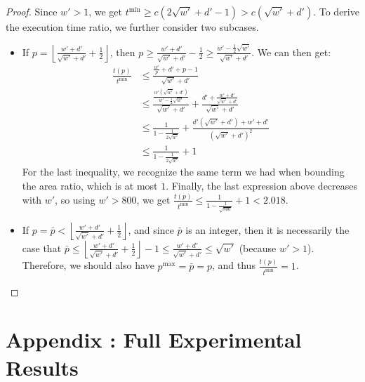 \documentclass{article}
\begin{document}
\begin{proof}
Since $w'>1$, we get $t^{\min}\ge c(2\sqrt{w'}+d'-1)>c(\sqrt{w'}+d')$. To derive the execution time ratio, we further consider two subcases.
\begin{itemize}
\item If $p=\left\lfloor \frac{w'+d'}{\sqrt{w'}+d'} +\frac{1}{2}\right\rfloor$, then $p\geq \frac{w'+d'}{\sqrt{w'}+d'} - \frac{1}{2} \geq \frac{w'-\frac{1}{2}\sqrt{w'}}{\sqrt{w'}+d'}$. We can then get:
\begin{align*}
\frac{t(p)}{t^{\min}} &\leq \frac{\frac{w'}{p}+d'+p-1}{\sqrt{w'}+d'} \\
&\leq \frac{\frac{w'(\sqrt{w'}+d')}{w'-\frac{1}{2}\sqrt{w'}}}{\sqrt{w'}+d'}+\frac{d'+\frac{w'+d'}{\sqrt{w'}+d'}}{\sqrt{w'}+d'} \\
&\leq \frac{1}{1-\frac{1}{2\sqrt{w'}}}+\frac{d'(\sqrt{w'}+d')+w'+d'}{(\sqrt{w'}+d')^2}\\
&\leq \frac{1}{1-\frac{1}{2\sqrt{w'}}}+1
\end{align*}
For the last inequality, we recognize the same term we had when bounding the area ratio, which is at most $1$. Finally, the last expression above decreases with $w'$, so using $w'>800$, we get $\frac{t(p)}{t^{\min}} \le \frac{1}{1-\frac{1}{\sqrt{800}}}+1<2.018$.
\item If $p = \bar{p} < \left\lfloor \frac{w'+d'}{\sqrt{w'}+d'} +\frac{1}{2}\right\rfloor$, and since $\bar{p}$ is an integer, then it is necessarily the case that $\bar{p} \le \left\lfloor \frac{w'+d'}{\sqrt{w'}+d'} +\frac{1}{2}\right\rfloor - 1 \le \frac{w'+d'}{\sqrt{w'}+d'} \leq \sqrt{w'}$ (because $w'>1$). Therefore, we should also have $p^{\max} = \bar{p} = p$, and thus $\frac{t(p)}{t^{\min}}=1$. \qedhere
\end{itemize}
\end{proof}

\FloatBarrier 
\newpage
\section{Appendix : Full Experimental Results}
\end{document}

